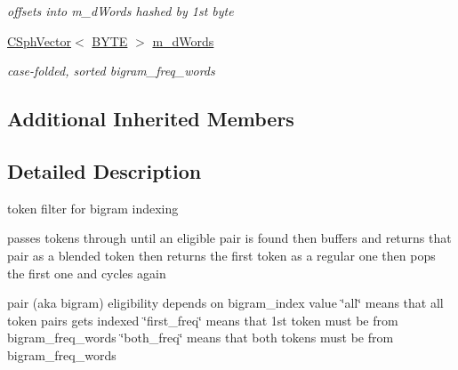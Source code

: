 \begin{DoxyCompactItemize}
\begin{DoxyCompactList}\small\item\em offsets into m\-\_\-d\-Words hashed by 1st byte \end{DoxyCompactList}\item 
\hyperlink{classCSphVector}{C\-Sph\-Vector}$<$ \hyperlink{sphinxstd_8h_a4ae1dab0fb4b072a66584546209e7d58}{B\-Y\-T\-E} $>$ \hyperlink{classCSphBigramTokenizer_a86e765410f9204eace7dee93253bbed4}{m\-\_\-d\-Words}
\begin{DoxyCompactList}\small\item\em case-\/folded, sorted bigram\-\_\-freq\-\_\-words \end{DoxyCompactList}\end{DoxyCompactItemize}
\subsection*{Additional Inherited Members}


\subsection{Detailed Description}
token filter for bigram indexing

passes tokens through until an eligible pair is found then buffers and returns that pair as a blended token then returns the first token as a regular one then pops the first one and cycles again

pair (aka bigram) eligibility depends on bigram\-\_\-index value \char`\"{}all\char`\"{} means that all token pairs gets indexed \char`\"{}first\-\_\-freq\char`\"{} means that 1st token must be from bigram\-\_\-freq\-\_\-words \char`\"{}both\-\_\-freq\char`\"{} means that both tokens must be from bigram\-\_\-freq\-\_\-words 

